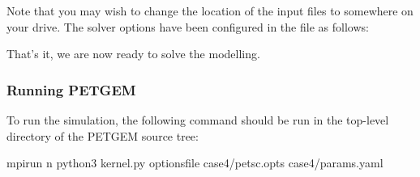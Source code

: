 \documentclass[letterpaper,10pt,english]{sphinxmanual}
\begin{document}
\begin{sphinxVerbatim}[commandchars=\\\{\}]
          
      

                                  
              
      
\end{sphinxVerbatim}

Note that you may wish to change the location of the input files to
somewhere on your drive. The solver options have been configured in the  file as follows:

\begin{sphinxVerbatim}[commandchars=\\\{\}]
 
 
\end{sphinxVerbatim}

That’s it, we are now ready to solve the modelling.


\subsubsection{Running PETGEM}
\label{\detokenize{Manual:id14}}
To run the simulation, the following command should be run in the top-level
directory of the PETGEM source tree:

\begin{sphinxVerbatim}[commandchars=\\\{\}]
\PYGZdl{} mpirun \PYGZhy{}n  python3 kernel.py \PYGZhy{}options\PYGZus{}file case4/petsc.opts case4/params.yaml
\end{sphinxVerbatim}
\end{document}
